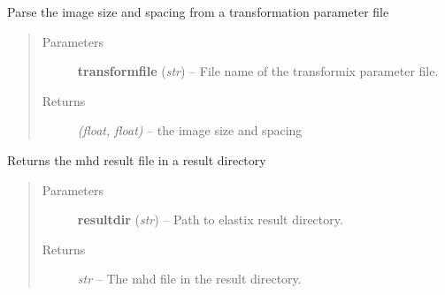 \documentclass[letterpaper,10pt,english]{sphinxmanual}
\begin{document}

\begin{fulllineitems}
\label{api/ClearMap.Alignment:ClearMap.Alignment.Elastix.getTransformFileSizeAndSpacing}
Parse the image size and spacing from a transformation parameter file
\begin{quote}\begin{description}
\item[{Parameters}] \leavevmode
\textbf{transformfile} (\emph{str}) --
File name of the transformix parameter file.

\item[{Returns}] \leavevmode
\emph{(float, float)} --
the image size and spacing

\end{description}\end{quote}

\end{fulllineitems}


\begin{fulllineitems}
\label{api/ClearMap.Alignment:ClearMap.Alignment.Elastix.getResultDataFile}
Returns the mhd result file in a result directory
\begin{quote}\begin{description}
\item[{Parameters}] \leavevmode
\textbf{resultdir} (\emph{str}) --
Path to elastix result directory.

\item[{Returns}] \leavevmode
\emph{str} --
The mhd file in the result directory.

\end{description}\end{quote}

\end{fulllineitems}

\end{document}

